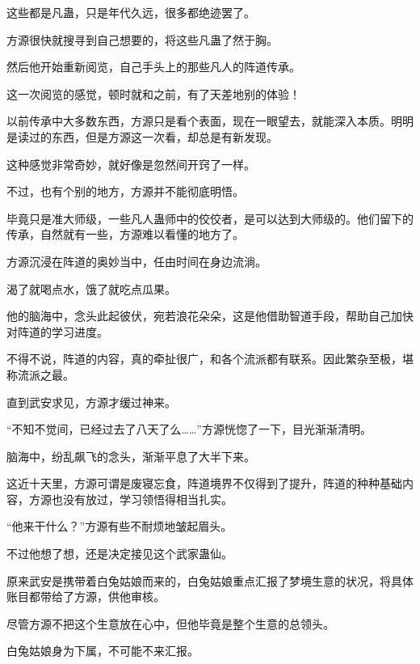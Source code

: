 \begin{this_body}
这些都是凡蛊，只是年代久远，很多都绝迹罢了。

方源很快就搜寻到自己想要的，将这些凡蛊了然于胸。

然后他开始重新阅览，自己手头上的那些凡人的阵道传承。

这一次阅览的感觉，顿时就和之前，有了天差地别的体验！

以前传承中大多数东西，方源只是看个表面，现在一眼望去，就能深入本质。明明是读过的东西，但是方源这一次看，却总是有新发现。

这种感觉非常奇妙，就好像是忽然间开窍了一样。

不过，也有个别的地方，方源并不能彻底明悟。

毕竟只是准大师级，一些凡人蛊师中的佼佼者，是可以达到大师级的。他们留下的传承，自然就有一些，方源难以看懂的地方了。

方源沉浸在阵道的奥妙当中，任由时间在身边流淌。

渴了就喝点水，饿了就吃点瓜果。

他的脑海中，念头此起彼伏，宛若浪花朵朵，这是他借助智道手段，帮助自己加快对阵道的学习进度。

不得不说，阵道的内容，真的牵扯很广，和各个流派都有联系。因此繁杂至极，堪称流派之最。

直到武安求见，方源才缓过神来。

“不知不觉间，已经过去了八天了么……”方源恍惚了一下，目光渐渐清明。

脑海中，纷乱飙飞的念头，渐渐平息了大半下来。

这近十天里，方源可谓是废寝忘食，阵道境界不仅得到了提升，阵道的种种基础内容，方源也没有放过，学习领悟得相当扎实。

“他来干什么？”方源有些不耐烦地皱起眉头。

不过他想了想，还是决定接见这个武家蛊仙。

原来武安是携带着白兔姑娘而来的，白兔姑娘重点汇报了梦境生意的状况，将具体账目都带给了方源，供他审核。

尽管方源不把这个生意放在心中，但他毕竟是整个生意的总领头。

白兔姑娘身为下属，不可能不来汇报。

\end{this_body}

